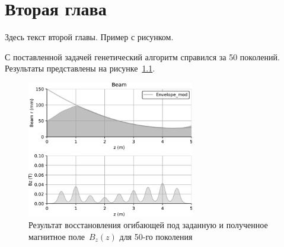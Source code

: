 \chapter{Вторая глава}
Здесь текст второй главы. Пример с рисунком.

С поставленной задачей генетический алгоритм справился за 50 поколений. Результаты представлены на рисунке~\ref{fig:genetic_envelope}.

\begin{figure}[!ht]
    \centering
    \includegraphics[width=0.65\textwidth]{figures/genetic_envelope_bw.png}
    \caption{Результат восстановления огибающей под заданную 
    и полученное магнитное поле~$B_z(z)$ для 50-го поколения}
    \label{fig:genetic_envelope}
\end{figure}